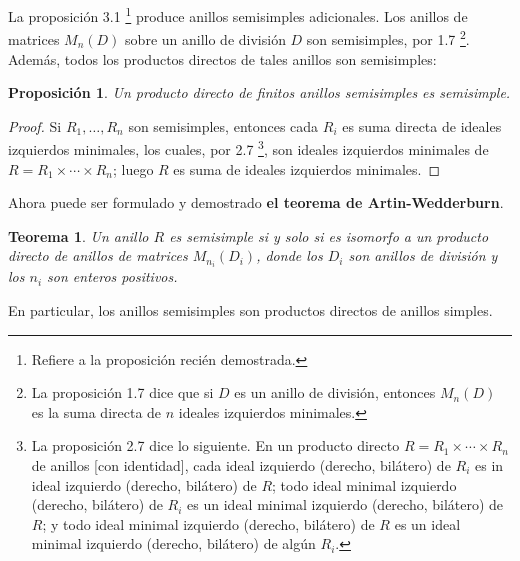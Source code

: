 \documentclass{article}
\newtheorem{theorem}{Teorema}[section]
\newtheorem{proposition}{Proposición}[section]
\begin{document}
La proposición 3.1
\footnote{Refiere a la proposición recién demostrada.}
produce anillos semisimples adicionales.
Los anillos de matrices $M_n(D)$ sobre un anillo de división $D$ son semisimples, por 1.7
\footnote{La proposición 1.7 dice que si $D$ es un anillo de división, entonces $M_n(D)$ es la suma directa de $n$ ideales izquierdos minimales.}.
Además, todos los productos directos de tales anillos son semisimples:

\begin{proposition}
    Un producto directo de finitos anillos semisimples es semisimple.
\end{proposition}

\begin{proof}
    Si $R_1, \ldots, R_n$ son semisimples, entonces cada $R_i$ es suma directa de ideales izquierdos minimales, los cuales, por 2.7
    \footnote{
        La proposición 2.7 dice lo siguiente.
        En un producto directo $R = R_1 \times \cdots \times R_n$ de anillos [con identidad], cada ideal izquierdo (derecho, bilátero) de $R_i$ es in ideal izquierdo (derecho, bilátero) de $R$;
        todo ideal minimal izquierdo (derecho, bilátero) de $R_i$ es un ideal minimal izquierdo (derecho, bilátero) de $R$;
        y todo ideal minimal izquierdo (derecho, bilátero) de $R$ es un ideal minimal izquierdo (derecho, bilátero) de algún $R_i$.
    }, son ideales izquierdos minimales de $R = R_1 \times \cdots \times R_n$; luego $R$ es suma de ideales izquierdos minimales.
\end{proof}

Ahora puede ser formulado y demostrado \textbf{el teorema de Artin-Wedderburn}.

\begin{theorem}\label{thm:artin-wedderburn}
    Un anillo $R$ es semisimple si y solo si es isomorfo a un producto directo de anillos de matrices $M_{n_i}(D_i)$, donde los $D_i$ son anillos de división y los $n_i$ son enteros positivos.
\end{theorem}

En particular, los anillos semisimples son productos directos de anillos simples.
\end{document}
